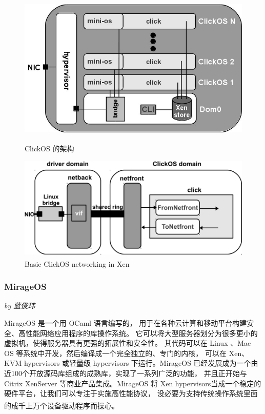 \documentclass[UTF8,fontset=none,linespread=1.15]{ctexart}
\let\nosupcite\cite
\renewcommand*{\cite}[1]{\textsuperscript{\nosupcite{#1}}}
\newcommand{\sectionauthor}[1]{%
\vspace*{-5ex}
\noindent\textrm{\hfill\textit{by #1}}
\vspace*{2ex}\par}
\begin{document}
\begin{figure}[H]
\begin{minipage}{0.49\linewidth}
\includegraphics[width=\linewidth]{pictures/clickOS_arch.jpg}
\caption{ClickOS 的架构\cite{bib:13-clickos2}}
\end{minipage}
\begin{minipage}{0.49\linewidth}
\includegraphics[width=\linewidth]{pictures/ClickOS_networking.png}
\caption{Basic ClickOS networking in Xen\cite{bib:12-clickos}}
\end{minipage}
\end{figure}

\subsubsection{MirageOS}\sectionauthor{蓝俊玮}

MirageOS 是一个用 OCaml 语言编写的，
用于在各种云计算和移动平台构建安全、高性能网络应用程序的库操作系统。
它可以将大型服务器划分为很多更小的虚拟机，使得服务器具有更强的拓展性和安全性。
其代码可以在 Linux 、Mac OS 等系统中开发，然后编译成一个完全独立的、专门的内核，
可以在 Xen、KVM hypervisors 或轻量级 hypervisors 下运行。MirageOS
已经发展成为一个由近100个开放源码库组成的成熟库，实现了一系列广泛的功能，
并且正开始与 Citrix XenServer 等商业产品集成。MirageOS
将 Xen hypervisors当成一个稳定的硬件平台，让我们可以专注于实施高性能协议，
没必要为支持传统操作系统里面的成千上万个设备驱动程序而操心。\cite{bib:11-unikerel2}
\end{document}
